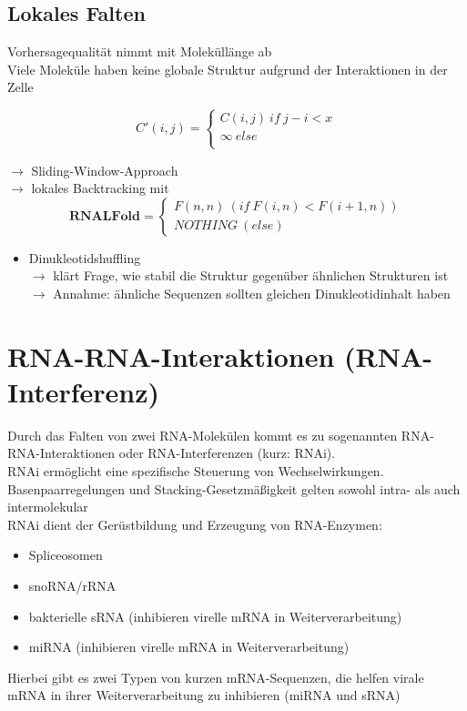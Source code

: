 \subsection{Lokales Falten}

Vorhersagequalität nimmt mit Moleküllänge ab \\
Viele Moleküle haben keine globale Struktur aufgrund der Interaktionen in der Zelle

\begin{equation}
C'(i,j) =
\begin{cases}
C(i,j) \ if \ j-i<x \\
\infty \ else \\
\end{cases}
\end{equation}

$\rightarrow$ Sliding-Window-Approach \\

$\rightarrow$ lokales Backtracking mit 
\begin{equation}
\textbf{RNALFold} = 
\begin{cases}
F(n,n) \ (if \ F(i,n)<F(i+1,n)) \\
NOTHING \ (else)
\end{cases}
\end{equation}

\begin{itemize}
\item Dinukleotidshuffling \\ $\rightarrow$ klärt Frage, wie stabil die Struktur gegenüber ähnlichen Strukturen ist \\ $\rightarrow$ Annahme: ähnliche Sequenzen sollten gleichen Dinukleotidinhalt haben 
\end{itemize}

\section{RNA-RNA-Interaktionen (RNA-Interferenz)}
Durch das Falten von zwei RNA-Molekülen kommt es zu sogenannten RNA-RNA-Interaktionen oder RNA-Interferenzen (kurz: RNAi). \\
RNAi ermöglicht eine spezifische Steuerung von Wechselwirkungen. \\

Basenpaarregelungen und Stacking-Gesetzmäßigkeit gelten sowohl intra- als auch intermolekular \\

RNAi dient der Gerüstbildung und Erzeugung von RNA-Enzymen:
\begin{itemize}
\item Spliceosomen
\item snoRNA/rRNA
\item bakterielle sRNA (inhibieren virelle mRNA in Weiterverarbeitung)
\item miRNA (inhibieren virelle mRNA in Weiterverarbeitung)
\end{itemize}
Hierbei gibt es zwei Typen von kurzen mRNA-Sequenzen, die helfen virale mRNA in ihrer Weiterverarbeitung zu inhibieren (miRNA und sRNA) \\

